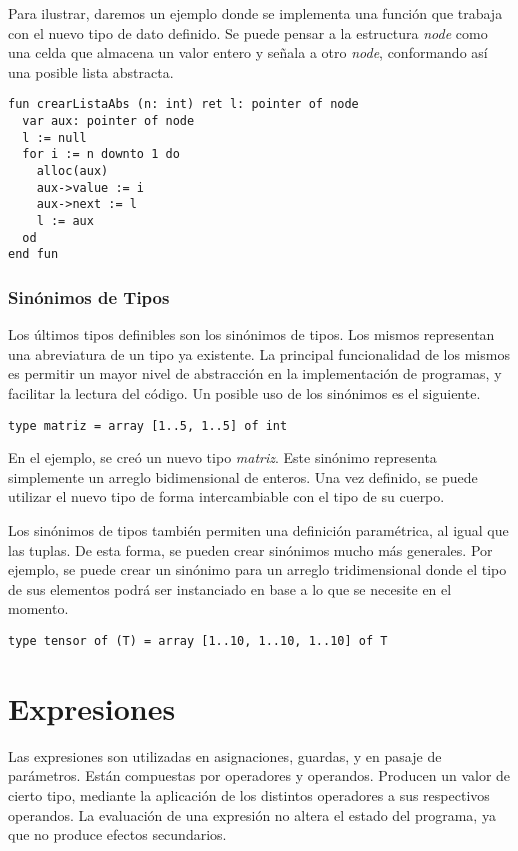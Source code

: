 \documentclass{article}
\begin{document}
Para ilustrar, daremos un ejemplo donde se implementa una función que trabaja con el nuevo tipo de dato definido.
Se puede pensar a la estructura \textit{node} como una celda que almacena un valor entero y señala a otro \textit{node}, conformando así una posible lista abstracta.
\begin{lstlisting}
fun crearListaAbs (n: int) ret l: pointer of node
  var aux: pointer of node
  l := null
  for i := n downto 1 do
    alloc(aux)
    aux->value := i
    aux->next := l
    l := aux
  od
end fun
\end{lstlisting}

\subsubsection{Sinónimos de Tipos}

Los últimos tipos definibles son los sinónimos de tipos.
Los mismos representan una abreviatura de un tipo ya existente.
La principal funcionalidad de los mismos es permitir un mayor nivel de abstracción en la implementación de programas, y facilitar la lectura del código.
Un posible uso de los sinónimos es el siguiente.
\begin{lstlisting}
type matriz = array [1..5, 1..5] of int
\end{lstlisting}

En el ejemplo, se creó un nuevo tipo \textit{matriz}.
Este sinónimo representa simplemente un arreglo bidimensional de enteros.
Una vez definido, se puede utilizar el nuevo tipo de forma intercambiable con el tipo de su cuerpo.

Los sinónimos de tipos también permiten una definición paramétrica, al igual que las tuplas.
De esta forma, se pueden crear sinónimos mucho más generales.
Por ejemplo, se puede crear un sinónimo para un arreglo tridimensional donde el tipo de sus elementos podrá ser instanciado en base a lo que se necesite en el momento.
\begin{lstlisting}
type tensor of (T) = array [1..10, 1..10, 1..10] of T
\end{lstlisting}

\section{Expresiones}

Las expresiones son utilizadas en asignaciones, guardas, y en pasaje de parámetros.
Están compuestas por operadores y operandos.
Producen un valor de cierto tipo, mediante la aplicación de los distintos operadores a sus respectivos operandos.
La evaluación de una expresión no altera el estado del programa, ya que no produce efectos secundarios.
\end{document}
